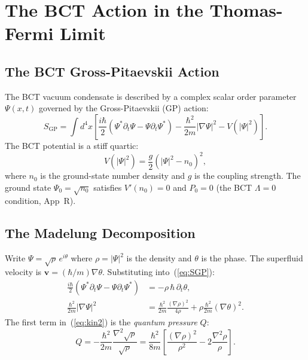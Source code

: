 \documentclass[11pt,a4paper]{article}
\theoremstyle{bctthm}
\theoremstyle{definition}
\begin{document}
\section{The BCT Action in the Thomas-Fermi Limit}

\subsection{The BCT Gross-Pitaevskii Action}

The BCT vacuum condensate is described by a complex scalar order parameter
$\Psi(x,t)$ governed by the Gross-Pitaevskii (GP) action:
\begin{equation}
S_\mathrm{GP} = \int d^4x\left[
\frac{i\hbar}{2}\left(\Psi^*\partial_t\Psi - \Psi\partial_t\Psi^*\right)
- \frac{\hbar^2}{2m}|\nabla\Psi|^2
- V(|\Psi|^2)\right].
\label{eq:SGP}
\end{equation}
The BCT potential is a stiff quartic:
\begin{equation}
V(|\Psi|^2) = \frac{g}{2}\left(|\Psi|^2 - n_0\right)^2,
\label{eq:Vgp}
\end{equation}
where $n_0$ is the ground-state number density and $g$ is the coupling strength.
The ground state $\Psi_0 = \sqrt{n_0}$ satisfies $V'(n_0) = 0$ and $P_0 = 0$
(the BCT $\Lambda=0$ condition, App~R).

\subsection{The Madelung Decomposition}

Write $\Psi = \sqrt{\rho}\,e^{i\theta}$ where $\rho = |\Psi|^2$ is the
density and $\theta$ is the phase. The superfluid velocity is
$\mathbf{v} = (\hbar/m)\nabla\theta$. Substituting into~(\ref{eq:SGP}):
\begin{align}
\frac{i\hbar}{2}(\Psi^*\partial_t\Psi - \Psi\partial_t\Psi^*) &=
-\rho\,\hbar\,\partial_t\theta, \label{eq:kin1}\\
\frac{\hbar^2}{2m}|\nabla\Psi|^2 &=
\frac{\hbar^2}{2m}\frac{(\nabla\rho)^2}{4\rho}
+ \rho\frac{\hbar^2}{2m}(\nabla\theta)^2. \label{eq:kin2}
\end{align}
The first term in~(\ref{eq:kin2}) is the \emph{quantum pressure} $Q$:
\begin{equation}
Q = -\frac{\hbar^2}{2m}\frac{\nabla^2\sqrt{\rho}}{\sqrt{\rho}}
= \frac{\hbar^2}{8m}\left[\frac{(\nabla\rho)^2}{\rho^2}
- 2\frac{\nabla^2\rho}{\rho}\right].
\end{equation}
\end{document}
